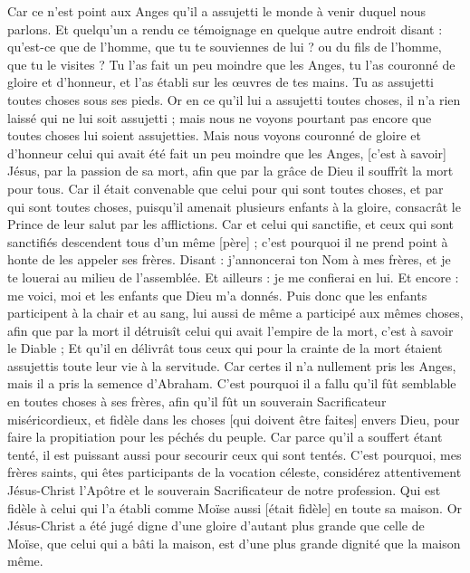 \begin{multicols}{2}
Car ce n'est point aux Anges qu'il a assujetti le monde à venir duquel nous parlons.
Et quelqu'un a rendu ce témoignage en quelque autre endroit disant : qu'est-ce que de l'homme, que tu te souviennes de lui ? ou du fils de l'homme, que tu le visites ?
Tu l'as fait un peu moindre que les Anges, tu l'as couronné de gloire et d'honneur, et l'as établi sur les œuvres de tes mains.
Tu as assujetti toutes choses sous ses pieds. Or en ce qu'il lui a assujetti toutes choses, il n'a rien laissé qui ne lui soit assujetti ; mais nous ne voyons pourtant pas encore que toutes choses lui soient assujetties.
Mais nous voyons couronné de gloire et d'honneur celui qui avait été fait un peu moindre que les Anges, [c'est à savoir] Jésus, par la passion de sa mort, afin que par la grâce de Dieu il souffrît la mort pour tous.
Car il était convenable que celui pour qui sont toutes choses, et par qui sont toutes choses, puisqu'il amenait plusieurs enfants à la gloire, consacrât le Prince de leur salut par les afflictions.
Car et celui qui sanctifie, et ceux qui sont sanctifiés descendent tous d'un même [père] ; c'est pourquoi il ne prend point à honte de les appeler ses frères.
Disant : j'annoncerai ton Nom à mes frères, et je te louerai au milieu de l'assemblée.
Et ailleurs : je me confierai en lui. Et encore : me voici, moi et les enfants que Dieu m'a donnés.
Puis donc que les enfants participent à la chair et au sang, lui aussi de même a participé aux mêmes choses, afin que par la mort il détruisît celui qui avait l'empire de la mort, c'est à savoir le Diable ;
Et qu'il en délivrât tous ceux qui pour la crainte de la mort étaient assujettis toute leur vie à la servitude.
Car certes il n'a nullement pris les Anges, mais il a pris la semence d'Abraham.
C'est pourquoi il a fallu qu'il fût semblable en toutes choses à ses frères, afin qu'il fût un souverain Sacrificateur miséricordieux, et fidèle dans les choses [qui doivent être faites] envers Dieu, pour faire la propitiation pour les péchés du peuple.
Car parce qu'il a souffert étant tenté, il est puissant aussi pour secourir ceux qui sont tentés.
\VerseOne{}C'est pourquoi, mes frères saints, qui êtes participants de la vocation céleste, considérez attentivement Jésus-Christ l'Apôtre et le souverain Sacrificateur de notre profession.
Qui est fidèle à celui qui l'a établi comme Moïse aussi [était fidèle] en toute sa maison.
Or Jésus-Christ a été jugé digne d'une gloire d'autant plus grande que celle de Moïse, que celui qui a bâti la maison, est d'une plus grande dignité que la maison même.

\end{multicols}
